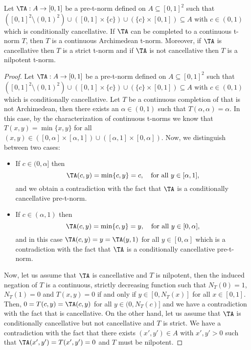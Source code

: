 \begin{proposition}\label{prop:CC->ArchiCompletion}
	Let $\TA : A \to [0,1]$ be a pre-t-norm defined on $A \subseteq [0,1]^2$ such that $([0,1]^2 \setminus (0,1)^2)\cup([0,1]\times\{c\}) \cup (\{c\} \times [0,1]) \subseteq A$ with $c \in (0,1)$ which is conditionally cancellative. If $\TA$ can be completed to a continuous t-norm $T$, then $T$ is a continuous Archimedean t-norm. Moreover, if $\TA$ is cancellative then $T$ is a strict t-norm and if $\TA$ is not cancellative then $T$ is a nilpotent t-norm.
\end{proposition}
\begin{proof}
	Let $\TA : A \to [0,1]$ be a pre-t-norm defined on $A \subseteq [0,1]^2$ such that $([0,1]^2 \setminus (0,1)^2)\cup([0,1]\times\{c\}) \cup (\{c\} \times [0,1]) \subseteq A$ with $c \in (0,1)$ which is conditionally cancellative. Let $T$ be a continuous completion of \TA that is not Archimedean, then there exists an $\alpha \in (0,1)$ such that $T(\alpha,\alpha)=\alpha$. In this case, by the characterization of continuous t-norms we know that $T(x,y)=\min \{x,y\}$ for all $(x,y) \in ([0,\alpha] \times [\alpha,1]) \cup ([\alpha,1] \times [0,\alpha])$. Now, we distinguish between two cases:
	\begin{itemize}
		\item If $c \in (0,\alpha]$ then
		$$\TA(c,y)=\min \{c,y\}=c, \quad \text{for all } y \in [\alpha,1],$$
		and we obtain a contradiction with the fact that $\TA$ is a conditionally cancellative pre-t-norm.
		\item If $c \in (\alpha,1)$ then
		$$\TA(c,y)=\min \{c,y\}=y, \quad \text{for all } y \in [0,\alpha],$$
		and in this case $\TA(c,y)=y=\TA(y,1)$ for all $y \in [0,\alpha]$ which is a contradiction with the fact that $\TA$ is a conditionally cancellative pre-t-norm.
	\end{itemize}
	Now, let us assume that $\TA$ is cancellative and $T$ is nilpotent, then the induced negation of $T$ is a continuous, strictly decreasing function such that $N_T(0)=1$, $N_T(1)=0$ and $T(x,y)=0$ if and only if $y \in [0,N_T(x)]$ for all $x \in [0,1]$. Then, $0=T(c,y)=\TA(c,y)$ for all $y \in (0,N_T(c)]$ and we have a contradiction with the fact that \TA is cancellative. On the other hand, let us assume that $\TA$ is conditionally cancellative but not cancellative and $T$ is strict. We have a contradiction with the fact that there exists $(x',y') \in A$ with $x',y'>0$ such that $\TA(x',y')=T(x',y')=0$ and $T$ must be nilpotent.
\end{proof}

